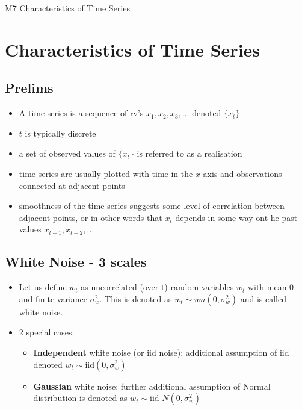 \documentclass{article}
\begin{document}
\pagebreak


\begin{center}
    \Large{M7 Characteristics of Time Series}
\end{center}

\section{Characteristics of Time Series}

\subsection{Prelims}

\begin{itemize}
    \item A time series is a sequence of rv's $x_1, x_2, x_3,...$ denoted $\{x_t\}$
    \item $t$ is typically discrete
    \item a set of observed values of $\{x_t\}$ is referred to as a realisation
    \item time series are usually plotted with time in the $x$-axis and observations connected at adjacent points
    \item smoothness of the time series suggests some level of correlation between adjacent points, or in other words that $x_t$ depends in some way ont he past values $x_{t-1}, x_{t-2},...$
\end{itemize}


\subsection{White Noise - 3 scales}

\begin{itemize}
    \item Let us define $w_t$ as uncorrelated (over t) random variables $w_t$ with mean 0 and finite variance $\sigma^2_w$. This is denoted as $w_t \sim wn(0,\sigma^2_w)$ and is called white noise.
    \item 2 special cases:
    \begin{itemize}
        \item \textbf{Independent} white noise (or iid noise): additional assumption of iid denoted $w_t \sim \text{iid}(0,\sigma^2_w)$
        \item \textbf{Gaussian} white noise: further additional assumption of Normal distribution is denoted as $w_t \sim \text{iid} \, \, N(0,\sigma^2_w)$
    \end{itemize}
\end{itemize}
\end{document}
